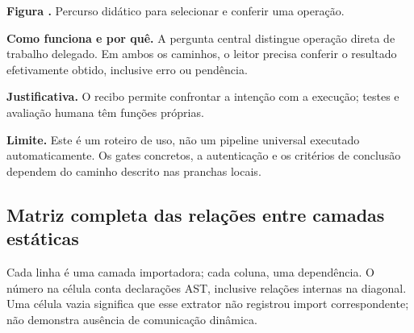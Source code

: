 \noindent\textbf{Figura \thefigure.} Percurso didático para selecionar e conferir uma operação.\par

\noindent\textbf{Como funciona e por quê.} A pergunta central distingue operação direta de trabalho delegado. Em ambos os caminhos, o leitor precisa conferir o resultado efetivamente obtido, inclusive erro ou pendência.\par

\noindent\textbf{Justificativa.} O recibo permite confrontar a intenção com a execução; testes e avaliação humana têm funções próprias.\par

\noindent\textbf{Limite.} Este é um roteiro de uso, não um pipeline universal executado automaticamente. Os gates concretos, a autenticação e os critérios de conclusão dependem do caminho descrito nas pranchas locais.\par


\clearpage{}\label{fig:global-matrix}

\subsection*{Matriz completa das relações entre camadas estáticas}

\noindent Cada linha é uma camada importadora; cada coluna, uma dependência. O número na célula conta declarações AST, inclusive relações internas na diagonal. Uma célula vazia significa que esse extrator não registrou import correspondente; não demonstra ausência de comunicação dinâmica.\par\medskip

